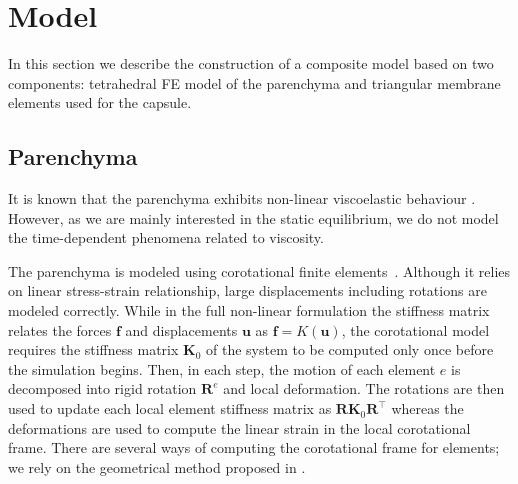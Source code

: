 \documentclass{acm_proc_article-sp}
\renewcommand{\Vec}[1]{\mathbf{#1}}
\newcommand{\Mat}[1]{\mathbf{#1}}
\begin{document}


\section{Model} %

In this section we describe the construction of a composite model
based on two components: tetrahedral FE model of the 
parenchyma and
triangular membrane elements used for the capsule.

\subsection{Parenchyma} %

It is known that the parenchyma exhibits non-linear viscoelastic behaviour \cite{Marchesseau2010}.
However, as we are mainly interested in the static equilibrium, we do not model the time-dependent
phenomena related to viscosity.


The parenchyma is modeled using corotational finite elements~\cite{Felippa2005}.
Although it relies on linear stress-strain relationship, large displacements including rotations are modeled correctly. 
While in the full non-linear formulation the stiffness matrix relates the forces $\Vec{f}$ and 
displacements $\Vec{u}$ as $\Vec{f} = K(\Vec{u})$, the corotational model 
requires the stiffness matrix $\Mat{K}_0$ of the system to be computed only once before the simulation begins. 
Then, in each step, the motion of each element $e$ is decomposed into rigid rotation $\Mat{R}^e$ and local deformation. 
The rotations are then used to update each local element stiffness matrix as $\Mat{R}\Mat{K}_0\Mat{R}^{\top}$
whereas the deformations are used to compute the linear strain in the local corotational frame.
There are several ways of computing the corotational frame for elements; we rely on
the geometrical method proposed in \cite{Nesme2005}.

\end{document}
